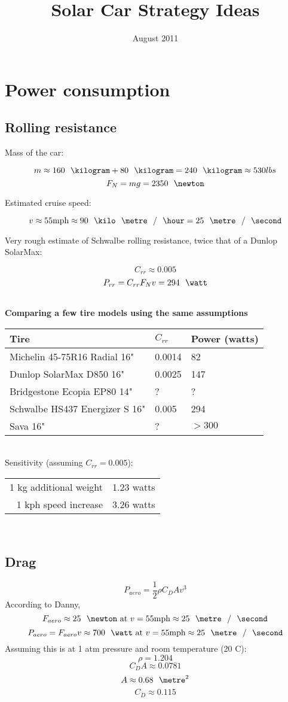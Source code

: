 \documentclass[letterpaper,12pt]{article}
\date{August 2011}
\author{}
\title{Solar Car Strategy Ideas}
\begin{document}
\maketitle

\section{Power consumption}
\subsection{Rolling resistance}

Mass of the car:

$$m \approx 160\kilogram + 80\kilogram = 240 \kilogram \approx 530 lbs$$
$$F_N = mg = 2350 \newton$$

Estimated cruise speed:

$$v \approx 55 \mbox{mph} \approx 90 \kilo\meter\per\hour = 25 \meter\per\second$$

Very rough estimate of Schwalbe rolling resistance, twice that of a Dunlop SolarMax:

$$C_{rr} \approx 0.005$$
$$P_{rr} = C_{rr}F_Nv = 294 \watt$$

\mbox{}\\
\textbf{Comparing a few tire models using the same assumptions}

\begin{tabular}{l|l|l}
Tire & $C_{rr}$ & Power (watts) \\
\hline 
Michelin 45-75R16 Radial 16" & 0.0014 & 82 \\
Dunlop SolarMax D850 16" & 0.0025 & 147 \\
Bridgestone Ecopia EP80 14" & ? & ? \\
Schwalbe HS437 Energizer S 16" & 0.005 & 294 \\
Sava 16"  & ? & $>300$
\end{tabular}

\mbox{}\\
Sensitivity (assuming $C_{rr} = 0.005$):


\begin{tabular}{r|l}
1 kg additional weight & 1.23 watts \\
1 kph speed increase & 3.26 watts 
\end{tabular}
\mbox{}\\

\subsection{Drag}
$$P_{aero} = \frac 1 2 \rho C_D A v^3 $$
According to Danny, 
$$F_{aero} \approx 25 \newton \mbox{ at } v = 55 \mbox{mph} \approx 25 \meter\per\second$$
$$P_{aero} = F_{aero}v \approx 700 \watt \mbox{ at } v = 55 \mbox{mph} \approx 25 \meter\per\second$$
Assuming this is at 1 atm pressure and room temperature (20 C):
$$\rho = 1.204$$
$$C_D A \approx 0.0781$$
$$A \approx 0.68 \meter^2$$
$$C_D \approx 0.115$$
\end{document}
